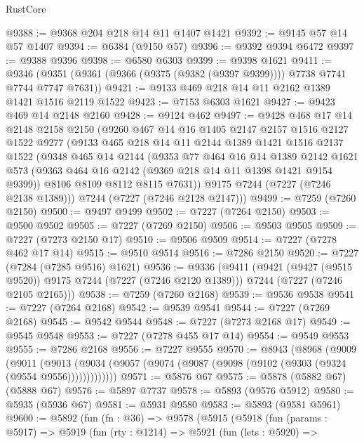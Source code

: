 \begin{lexlean}{RustCore}
\begin{coremodule}
@9388 := @9368 @204 @218 @14 @11 @1407 @1421
@9392 := @9145 @57 @14 @57 @1407
@9394 := @6384 (@9150 @57)
@9396 := @9392 @9394 @6472
@9397 := @9388 @9396
@9398 := @6580 @6303
@9399 := @9398 @1621
@9411 := @9346 (@9351 (@9361 (@9366 (@9375 (@9382 (@9397 @9399)))) @7738 @7741 @7744 @7747 @7631))
@9421 := @9133 @469 @218 @14 @11 @2162 @1389 @1421 @1516 @2119 @1522
@9423 := @7153 @6303 @1621
@9427 := @9423 @469 @14 @2148 @2160
@9428 := @9124 @462
@9497 := @9428
    @468
    @17
    @14
    @2148
    @2158
    @2150
    (@9260
      @467
      @14
      @16
      @1405
      @2147
      @2157
      @1516
      @2127
      @1522
      @9277
      (@9133
        @465
        @218
        @14
        @11
        @2144
        @1389
        @1421
        @1516
        @2137
        @1522
        (@9348
          @465
          @14
          @2144
          (@9353
            @77
            @464
            @16
            @14
            @1389
            @2142
            @1621
            @573
            (@9363 @464 @16 @2142 (@9369 @218 @14 @11 @1398 @1421 @9154 @9399))
            @8106
            @8109
            @8112
            @8115
            @7631))
        @9175
        @7244
        (@7227 (@7246 @2138 @1389)))
      @7244
      (@7227 (@7246 @2128 @2147)))
@9499 := @7259 (@7260 @2150)
@9500 := @9497 @9499
@9502 := @7227 (@7264 @2150)
@9503 := @9500 @9502
@9505 := @7227 (@7269 @2150)
@9506 := @9503 @9505
@9509 := @7227 (@7273 @2150 @17)
@9510 := @9506 @9509
@9514 := @7227 (@7278 @462 @17 @14)
@9515 := @9510 @9514
@9516 := @7286 @2150
@9520 := @7227 (@7284 (@7285 @9516) @1621)
@9536 := @9336
    (@9411
      (@9421 (@9427 (@9515 @9520)) @9175 @7244 (@7227 (@7246 @2120 @1389)))
      @7244
      (@7227 (@7246 @2105 @2165)))
@9538 := @7259 (@7260 @2168)
@9539 := @9536 @9538
@9541 := @7227 (@7264 @2168)
@9542 := @9539 @9541
@9544 := @7227 (@7269 @2168)
@9545 := @9542 @9544
@9548 := @7227 (@7273 @2168 @17)
@9549 := @9545 @9548
@9553 := @7227 (@7278 @455 @17 @14)
@9554 := @9549 @9553
@9555 := @7286 @2168
@9556 := @7227 @9555
@9570 := @8943
    (@8968
      (@9009
        (@9011
          (@9013 (@9034 (@9057 (@9074 (@9087 (@9098 (@9102 (@9303 (@9324 (@9554 @9556)))))))))))))
@9571 := @5876 @67
@9575 := @5878 (@5882 @67) (@5888 @67)
@9576 := @5897 @7737
@9578 := @5893 (@9576 @5912)
@9580 := @5935 (@5936 @67)
@9581 := @5931 @9580
@9583 := @5893 (@9581 @5961)
@9600 := @5892
    (fun (fn : @36) =>
    @9578
      (@5915
        (@5918
          (fun (params : @5917) =>
          @5919
            (fun (rty : @1214) =>
            @5921
              (fun (lets : @5920) =>

\end{coremodule}
\end{lexlean}
